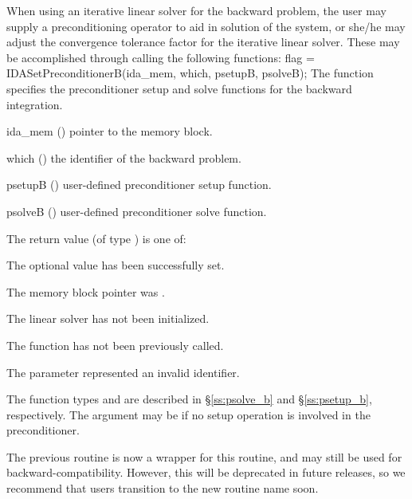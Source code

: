 When using an iterative linear solver for the backward problem, the
user may supply a preconditioning operator to aid in solution of the
system, or she/he may adjust the convergence tolerance factor for the
iterative linear solver.  These may be accomplished through calling
the following functions:
{
  flag = IDASetPreconditionerB(ida\_mem, which, psetupB, psolveB);
}
{
  The function  specifies the preconditioner
  setup and solve functions for the backward integration.
}
{
  \begin{args}[psetupB]
  \item[ida\_mem] ()
    pointer to the {\idas} memory block.
  \item[which] ()
    the identifier of the backward problem.
  \item[psetupB] ()
    user-defined preconditioner setup function.
  \item[psolveB] ()
    user-defined preconditioner solve function.
  \end{args}
}
{
  The return value  (of type ) is one of:
  \begin{args}
  \item[\Id{IDALS\_SUCCESS}]
    The optional value has been successfully set.
  \item[\Id{IDALS\_MEM\_NULL}]
    The  memory block pointer was .
  \item[\Id{IDALS\_LMEM\_NULL}]
    The {\idals} linear solver has not been initialized.
  \item[\Id{IDALS\_NO\_ADJ}]
    The function  has not been previously called.
  \item[\Id{IDALS\_ILL\_INPUT}]
    The parameter  represented an invalid identifier.
  \end{args}
}
{
  The function types  and  are
  described in \S\ref{ss:psolve_b} and \S\ref{ss:psetup_b}, respectively.
  The  argument may be  if no setup operation is involved
  in the preconditioner.

  The previous routine  is now a
  wrapper for this routine, and may still be used for
  backward-compatibility.  However, this will be deprecated in future
  releases, so we recommend that users transition to the new routine
  name soon.
}

